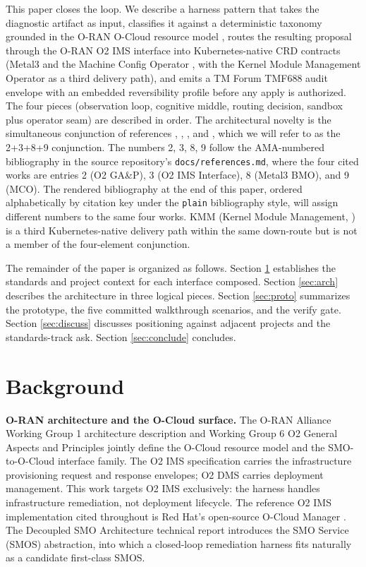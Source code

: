 \documentclass[twocolumn,10pt,a4paper]{article}
\begin{document}
This paper closes the loop. We describe a harness pattern that takes the diagnostic artifact as input, classifies it against a deterministic taxonomy grounded in the O-RAN O-Cloud resource model \cite{oran_wg1_arch,oran_o2_ganp}, routes the resulting proposal through the O-RAN O2 IMS interface \cite{oran_o2_ims} into Kubernetes-native CRD contracts (Metal3 \cite{metal3_bmo} and the Machine Config Operator \cite{openshift_mco}, with the Kernel Module Management Operator \cite{kmm_operator} as a third delivery path), and emits a TM Forum TMF688 audit envelope \cite{tmf688} with an embedded reversibility profile before any apply is authorized. The four pieces (observation loop, cognitive middle, routing decision, sandbox plus operator seam) are described in order. The architectural novelty is the simultaneous conjunction of references \cite{oran_o2_ganp}, \cite{oran_o2_ims}, \cite{metal3_bmo}, and \cite{openshift_mco}, which we will refer to as the 2+3+8+9 conjunction. The numbers 2, 3, 8, 9 follow the AMA-numbered bibliography in the source repository's \texttt{docs/references.md}, where the four cited works are entries 2 (O2 GA\&P), 3 (O2 IMS Interface), 8 (Metal3 BMO), and 9 (MCO). The rendered bibliography at the end of this paper, ordered alphabetically by citation key under the \texttt{plain} bibliography style, will assign different numbers to the same four works. KMM (Kernel Module Management, \cite{kmm_operator}) is a third Kubernetes-native delivery path within the same down-route but is not a member of the four-element conjunction.

The remainder of the paper is organized as follows. Section \ref{sec:background} establishes the standards and project context for each interface composed. Section \ref{sec:arch} describes the architecture in three logical pieces. Section \ref{sec:proto} summarizes the prototype, the five committed walkthrough scenarios, and the verify gate. Section \ref{sec:discuss} discusses positioning against adjacent projects and the standards-track ask. Section \ref{sec:conclude} concludes.

\section{Background}
\label{sec:background}

\textbf{O-RAN architecture and the O-Cloud surface.} The O-RAN Alliance Working Group 1 architecture description \cite{oran_wg1_arch} and Working Group 6 O2 General Aspects and Principles \cite{oran_o2_ganp} jointly define the O-Cloud resource model and the SMO-to-O-Cloud interface family. The O2 IMS specification \cite{oran_o2_ims} carries the infrastructure provisioning request and response envelopes; O2 DMS \cite{oran_o2_dms} carries deployment management. This work targets O2 IMS exclusively: the harness handles infrastructure remediation, not deployment lifecycle. The reference O2 IMS implementation cited throughout is Red Hat's open-source O-Cloud Manager \cite{oran_o2ims_ocm}. The Decoupled SMO Architecture technical report \cite{oran_decoupled_smo} introduces the SMO Service (SMOS) abstraction, into which a closed-loop remediation harness fits naturally as a candidate first-class SMOS.
\end{document}
